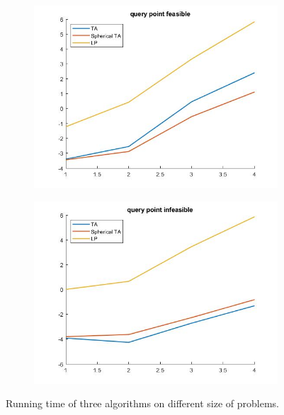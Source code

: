\documentclass[a4paper,12pt]{article}
\begin{document}
\begin{figure}[h!]
	\centering
	\begin{subfigure}[b]{0.45\linewidth}
		\includegraphics[width=\linewidth]{fea.jpg}
	\end{subfigure}
	\begin{subfigure}[b]{0.45\linewidth}
		\includegraphics[width=\linewidth]{infea.jpg}
	\end{subfigure}
	\caption{Running time of three algorithms on different size of problems.}
	\label{fig1}
\end{figure}

\newpage


\end{document}
